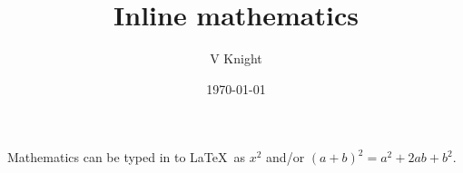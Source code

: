 \documentclass{article}
\title{Inline mathematics}
\author{V Knight}
\date{\today}
\begin{document}
\maketitle

Mathematics can be typed in to \LaTeX\ as $x^2$ and/or \((a+b)^2=a^2+2ab+b^2\).
\end{document}
